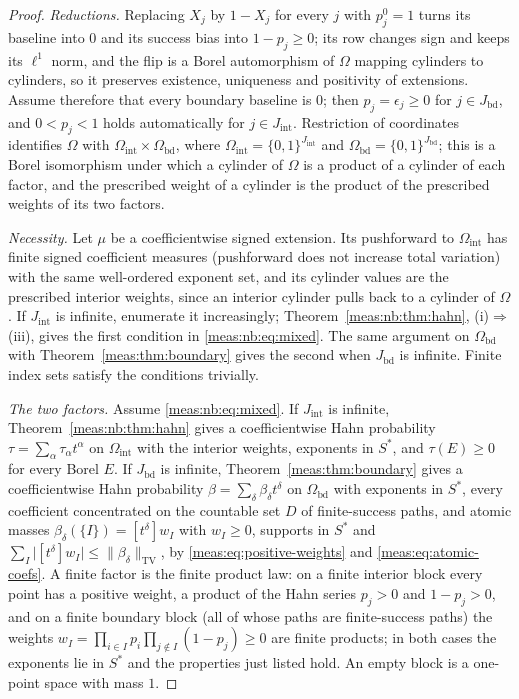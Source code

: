 \documentclass[11pt]{article}
\numberwithin{equation}{section}
\theoremstyle{definition}
\theoremstyle{remark}
\newcommand{\TV}{\mathrm{TV}}
\newcommand{\coef}[2]{[t^{#1}]#2}
\newcommand{\norm}[1]{\lVert#1\rVert}
\newcommand{\abs}[1]{\lvert#1\rvert}
\begin{document}
\begin{proof}
\emph{Reductions.} Replacing $X_j$ by $1-X_j$ for every $j$ with $p_j^0=1$ turns
its baseline into $0$ and its success bias into $1-p_j\ge0$; its row changes sign
and keeps its $\ell^1$ norm, and the flip is a Borel automorphism of $\Omega$ mapping
cylinders to cylinders, so it preserves existence, uniqueness and positivity of
extensions. Assume therefore that every boundary baseline is $0$; then
$p_j=\epsilon_j\ge0$ for $j\in J_{\mathrm{bd}}$, and $0<p_j<1$ holds automatically for
$j\in J_{\mathrm{int}}$. Restriction of coordinates identifies $\Omega$ with
$\Omega_{\mathrm{int}}\times\Omega_{\mathrm{bd}}$, where
$\Omega_{\mathrm{int}}=\{0,1\}^{J_{\mathrm{int}}}$ and
$\Omega_{\mathrm{bd}}=\{0,1\}^{J_{\mathrm{bd}}}$; this is a Borel isomorphism under which a
cylinder of $\Omega$ is a product of a cylinder of each factor, and the prescribed
weight of a cylinder is the product of the prescribed weights of its two factors.

\emph{Necessity.} Let $\mu$ be a coefficientwise signed extension. Its pushforward
to $\Omega_{\mathrm{int}}$ has finite signed coefficient measures (pushforward does not
increase total variation) with the same well-ordered exponent set, and its
cylinder values are the prescribed interior weights, since an interior cylinder
pulls back to a cylinder of $\Omega$. If $J_{\mathrm{int}}$ is infinite, enumerate it
increasingly; Theorem~\ref{meas:nb:thm:hahn}, (i)$\Rightarrow$(iii), gives the first
condition in \eqref{meas:nb:eq:mixed}. The same argument on $\Omega_{\mathrm{bd}}$ with
Theorem~\ref{meas:thm:boundary} gives the second when $J_{\mathrm{bd}}$ is infinite.
Finite index sets satisfy the conditions trivially.

\emph{The two factors.} Assume \eqref{meas:nb:eq:mixed}. If $J_{\mathrm{int}}$ is
infinite, Theorem~\ref{meas:nb:thm:hahn} gives a coefficientwise Hahn probability
$\tau=\sum_\alpha\tau_\alpha t^\alpha$ on $\Omega_{\mathrm{int}}$ with the interior weights,
exponents in $S^*$, and $\tau(E)\ge0$ for every Borel $E$. If $J_{\mathrm{bd}}$ is
infinite, Theorem~\ref{meas:thm:boundary} gives a coefficientwise Hahn probability
$\beta=\sum_\delta\beta_\delta t^\delta$ on $\Omega_{\mathrm{bd}}$ with exponents in $S^*$,
every coefficient concentrated on the countable set $D$ of finite-success paths,
and atomic masses $\beta_\delta(\{I\})=\coef\delta{w_I}$ with $w_I\ge0$, supports in
$S^*$ and $\sum_I\abs{\coef\delta{w_I}}\le\norm{\beta_\delta}_\TV$, by
\eqref{meas:eq:positive-weights} and \eqref{meas:eq:atomic-coefs}. A finite factor is
the finite product law: on a finite interior block every point has a positive
weight, a product of the Hahn series $p_j>0$ and $1-p_j>0$, and on a finite boundary
block (all of whose paths are finite-success paths) the weights
$w_I=\prod_{i\in I}p_i\prod_{j\notin I}(1-p_j)\ge0$ are finite products; in both cases
the exponents lie in $S^*$ and the properties just listed hold. An empty block is a
one-point space with mass $1$.


\end{proof}
\end{document}
